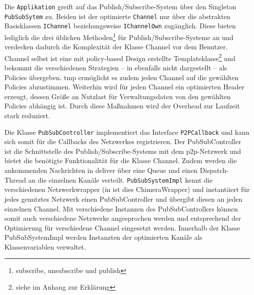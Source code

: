 Die \texttt{Applikation} greift auf das Publish/Subscribe-System über den Singleton \texttt{PubSubSytem} zu. Beiden ist der optimierte \texttt{Channel} nur über die abstrakten Basisklassen \texttt{IChannel} beziehungsweise \texttt{IChannelOwn} zugänglich. Diese bieten lediglich die drei üblichen Methoden\footnote{subscribe, unsubscribe und publish} für Publish/Subscribe-Systeme an und verdecken dadurch die Komplexität der Klasse Channel vor dem Benutzer. Channel selbst ist eine mit policy-based Design erstellte Templateklasse\footnote{siehe  im Anhang zur Erklärung} und bekommt die verschiedenen Strategien -- in  ebenfalls nicht dargestellt -- als Policies übergeben. \ac{tmp} ermöglicht es zudem jeden Channel auf die gewählten Policies abzustimmen. Weiterhin wird für jeden Channel ein optimierten Header erzeugt, dessen Größe an Nutzlast für Verwaltungsdaten von den gewählten Policies abhängig ist. Durch diese Maßnahmen wird der Overhead zur Laufzeit stark reduziert. 

Die Klasse \texttt{PubSubController} implementiert das Interface \texttt{P2PCallback} und kann sich somit für die Callbacks des Netzwerkes registrieren. Der PubSubController ist die Schnittstelle des Publish/Subscribe-Systems mit dem \ac{p2p}-Netzwerk und bietet die benötigte Funktionalität für die Klasse Channel. Zudem werden die ankommenden Nachrichten in deliver über eine Queue und einen Dispatch-Thread an die einzelnen Kanäle verteilt. \texttt{PubSubSystemImpl} kennt die verschiedenen Netzwerkwrapper (in  ist dies ChimeraWrapper) und instantiiert für jedes genutztes Netzwerk einen PubSubController und übergibt diesen an jeden einzelnen Channel. Mit verschiedene Instanzen des PubSubControllers können somit auch verschiedene Netzwerke angesprochen werden und entsprechend der Optimierung für verschiedene Channel eingesetzt werden. Innerhalb der Klasse PubSubSystemImpl werden Instanzten der optimierten Kanäle als Klassenvariablen verwaltet.

